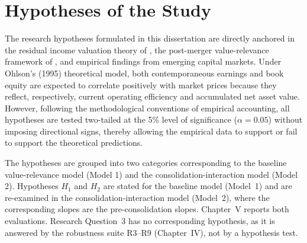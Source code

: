 \section{Hypotheses of the Study}
\label{sec:hypotheses}

The research hypotheses formulated in this dissertation are directly anchored in the residual income valuation theory of \citet{ohlson1995}, the post-merger value-relevance framework of \citet{kwon2020}, and empirical findings from emerging capital markets. Under Ohlson's (1995) theoretical model, both contemporaneous earnings and book equity are expected to correlate positively with market prices because they reflect, respectively, current operating efficiency and accumulated net asset value. However, following the methodological conventions of empirical accounting, all hypotheses are tested two-tailed at the 5\% level of significance ($\alpha = 0.05$) without imposing directional signs, thereby allowing the empirical data to support or fail to support the theoretical predictions.

The hypotheses are grouped into two categories corresponding to the baseline value-relevance model (Model 1) and the consolidation-interaction model (Model 2). Hypotheses $H_1$ and $H_2$ are stated for the baseline model (Model~1) and are re-examined in the consolidation-interaction model (Model~2), where the corresponding slopes are the pre-consolidation slopes. Chapter~V reports both evaluations. Research Question~3 has no corresponding hypothesis, as it is answered by the robustness suite R3--R9 (Chapter~IV), not by a hypothesis test.

